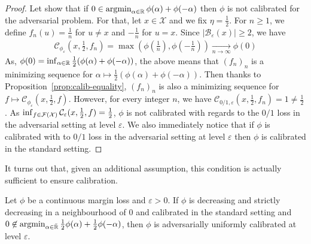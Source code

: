 \begin{proof}

    Let show that if $0\in\operatorname*{argmin}_{\alpha\in\mathbb{R}} \phi(\alpha)+\phi(-\alpha)$ then $\phi$ is not calibrated for the adversarial problem. For that, let $x\in\mathcal{X}$ and we fix $\eta = \frac12$.  For $n\geq1$, we define $f_n(u) = \frac1n$ for $u\neq x$ and $-\frac{1}{n}$ for $u=x$.  Since $\lvert\mathcal{B}_\varepsilon(x)\rvert\geq 2$, we have
    \begin{align*}
         \mathcal{C}_{\phi_\varepsilon}(x,\frac12,f_n) = \max\left(\phi(\frac1n),\phi(-\frac1n)\right)\xrightarrow[n\to\infty]{} \phi(0) %
    \end{align*}
    As, $\phi(0) = \inf_{\alpha\in\RR}\frac12\left(\phi(\alpha)+\phi(-\alpha)\right)$, the above means that $(f_n)_n$ is a minimizing sequence for $\alpha \mapsto \frac12 \left(\phi(\alpha)+\phi(-\alpha)\right)$. 
    Then thanks to Proposition~\ref{prop:calib-equality}, $(f_n)_n$ is also a minimizing sequence for $f \mapsto\mathcal{C}_{\phi_\varepsilon}(x,\frac12,f)$. However, for every integer $n$, we have $\mathcal{C}_{0/1,\varepsilon}(x,\frac12,f_n) =1\neq\frac12$. As  $\inf_{f\in\mathcal{F}(\mathcal{X})}\mathcal{C}_{\varepsilon}(x,\frac12,f)=\frac12$, $\phi$ is not calibrated with regards to the $0/1$ loss in the adversarial setting at level $\varepsilon$. We also immediately notice that if $\phi$ is  calibrated with to  $0/1$ loss in the adversarial setting at level $\varepsilon$ then $\phi$ is calibrated in the standard setting. 
    
    
\end{proof}



It turns out that, given an additional assumption, this condition is actually sufficient to ensure calibration.


\begin{thm} 
\label{thm:calibration-suf}
Let $\phi$  be a continuous margin loss and $\varepsilon>0$. If $\phi$ is decreasing and strictly decreasing in a neighbourhood of $0$ and calibrated in the standard setting and $0\not\in \operatorname*{argmin}_{\alpha\in\bar{\mathbb{R}}}
\frac12\phi(\alpha)+\frac12\phi(-\alpha)$, then $\phi$ is adversarially uniformly calibrated at level $\varepsilon$.
\end{thm}


